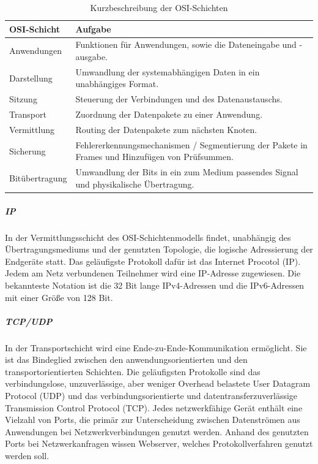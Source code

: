 \newpage

\begin{table}[]
\begin{center}
    \begin{tabular}{| l | p{8cm} |}
    \hline
     OSI-Schicht & Aufgabe \\ 
     \hline
        
       Anwendungen & Funktionen für Anwendungen, sowie die Dateneingabe und -ausgabe. \\
    \hline    
       Darstellung & Umwandlung der systemabhängigen Daten in ein unabhängiges Format.  \\
    \hline   
       Sitzung & Steuerung der Verbindungen und des Datenaustauschs.  \\
    \hline  
        Transport & Zuordnung der Datenpakete zu einer Anwendung. \\ 
    
    \hline     
    	Vermittlung & Routing der Datenpakete zum nächsten Knoten. \\
	
    \hline       
      Sicherung & Fehlererkennungsmechanismen / Segmentierung der Pakete in Frames und Hinzufügen von Prüfsummen.  \\   
    \hline
    
    Bitübertragung & Umwandlung der Bits in ein zum Medium passendes Signal und physikalische Übertragung.\\ 
    \hline    
    \end{tabular}
\end{center}
\caption{Kurzbeschreibung der OSI-Schichten \cite{ekOSI}}
\end{table}

\noindent
\subparagraph{IP}
In der Vermittlungsschicht des OSI-Schichtenmodells findet, unabhängig des Über\-tra\-gungs\-mediums und der genutzten Topologie, die logische Adressierung der Endgeräte statt. Das geläufigste Protokoll dafür ist das Internet Procotol (IP). Jedem am Netz verbundenen Teilnehmer wird eine IP-Adresse zugewiesen. Die bekannteste Notation ist die 32 Bit lange IPv4-Adressen und die IPv6-Adressen mit einer Größe von 128 Bit. 

\noindent
\subparagraph{TCP/UDP}
In der Transportschicht wird eine Ende-zu-Ende-Kommunikation ermöglicht. Sie ist das Bindeglied zwischen den anwendungsorientierten und den transportorientierten Schichten. Die geläufigsten Protokolle sind das verbindungslose, unzuverlässige, aber weniger Overhead belastete User Datagram Protocol (UDP) und das verbindungsorientierte und datentransferzuverlässige Transmission Control Protocol (TCP). Jedes netzwerkfähige Gerät enthält eine Vielzahl von Ports, die primär zur
Unterscheidung zwischen Datenströmen aus Anwendungen bei Netzwerkverbindungen
genutzt werden. Anhand des genutzten Ports bei Netzwerkanfragen
wissen Webserver, welches Protokollverfahren genutzt werden soll.

